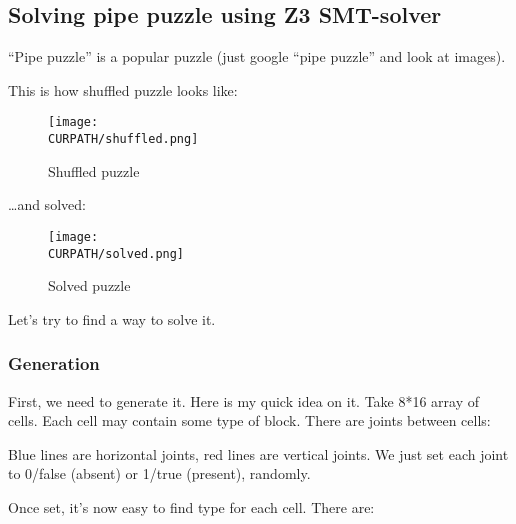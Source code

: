 \subsection{Solving pipe puzzle using Z3 SMT-solver}

\renewcommand{\CURPATH}{puzzles/pipe}

``Pipe puzzle'' is a popular puzzle (just google ``pipe puzzle'' and look at images).

This is how shuffled puzzle looks like:

\begin{figure}[H]
\label{fig:pipe_shuffled}
\centering
\texttt{[image: \\CURPATH/shuffled.png]}
\caption{Shuffled puzzle}
\end{figure}

\dots and solved:

\begin{figure}[H]
\label{fig:pipe_solved}
\centering
\texttt{[image: \\CURPATH/solved.png]}
\caption{Solved puzzle}
\end{figure}

Let's try to find a way to solve it.

\subsubsection{Generation}

First, we need to generate it.
Here is my quick idea on it.
Take 8*16 array of cells.
Each cell may contain some type of block.
There are joints between cells:



Blue lines are horizontal joints, red lines are vertical joints.
We just set each joint to 0/false (absent) or 1/true (present), randomly.

Once set, it's now easy to find type for each cell.
There are:

